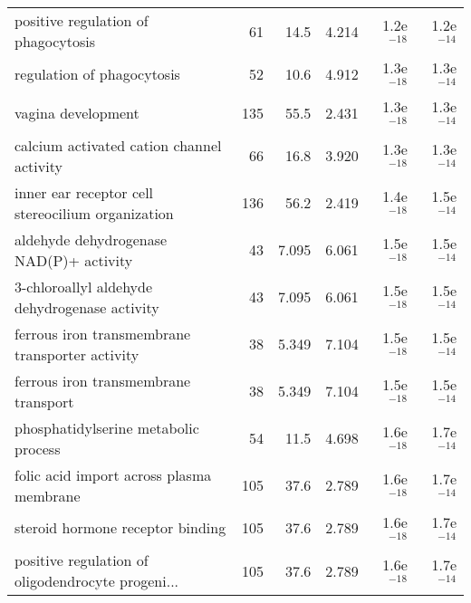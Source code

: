 \begin{longtable}{lrrrrr}
               positive regulation of phagocytosis &                      61 &                    14.5 &      4.214 &         1.2e$^{-18}$ &         1.2e$^{-14}$ \\
                        regulation of phagocytosis &                      52 &                    10.6 &      4.912 &         1.3e$^{-18}$ &         1.3e$^{-14}$ \\
                                vagina development &                     135 &                    55.5 &      2.431 &         1.3e$^{-18}$ &         1.3e$^{-14}$ \\
         calcium activated cation channel activity &                      66 &                    16.8 &      3.920 &         1.3e$^{-18}$ &         1.3e$^{-14}$ \\
 inner ear receptor cell stereocilium organization &                     136 &                    56.2 &      2.419 &         1.4e$^{-18}$ &         1.5e$^{-14}$ \\
           aldehyde dehydrogenase NAD(P)+ activity &                      43 &                   7.095 &      6.061 &         1.5e$^{-18}$ &         1.5e$^{-14}$ \\
     3-chloroallyl aldehyde dehydrogenase activity &                      43 &                   7.095 &      6.061 &         1.5e$^{-18}$ &         1.5e$^{-14}$ \\
   ferrous iron transmembrane transporter activity &                      38 &                   5.349 &      7.104 &         1.5e$^{-18}$ &         1.5e$^{-14}$ \\
              ferrous iron transmembrane transport &                      38 &                   5.349 &      7.104 &         1.5e$^{-18}$ &         1.5e$^{-14}$ \\
              phosphatidylserine metabolic process &                      54 &                    11.5 &      4.698 &         1.6e$^{-18}$ &         1.7e$^{-14}$ \\
          folic acid import across plasma membrane &                     105 &                    37.6 &      2.789 &         1.6e$^{-18}$ &         1.7e$^{-14}$ \\
                  steroid hormone receptor binding &                     105 &                    37.6 &      2.789 &         1.6e$^{-18}$ &         1.7e$^{-14}$ \\
 positive regulation of oligodendrocyte progeni... &                     105 &                    37.6 &      2.789 &         1.6e$^{-18}$ &         1.7e$^{-14}$ \\

\end{longtable}
